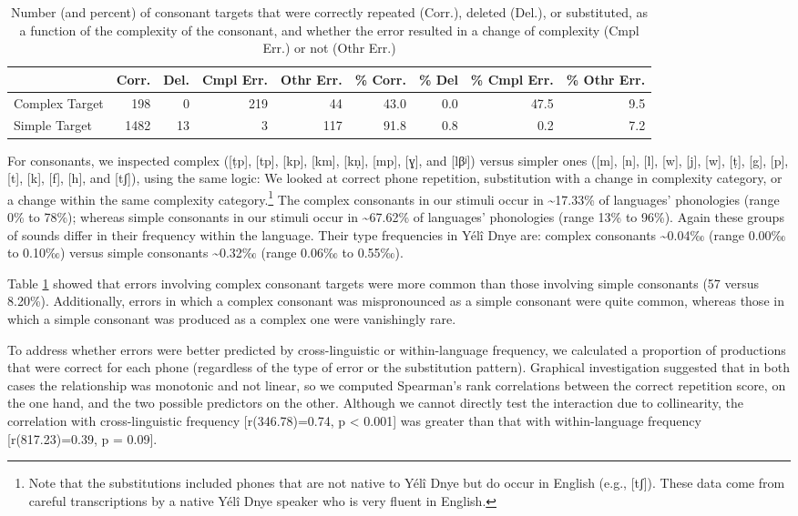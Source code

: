 \documentclass[
  english,
  ,man,floatsintext]{apa6}
\begin{document}
\begin{table}

\caption{\label{tab:tab-c}Number (and percent) of consonant targets that were correctly repeated (Corr.), deleted (Del.), or substituted, as a function of the complexity of the consonant, and whether the error resulted in a change of complexity (Cmpl Err.) or not (Othr Err.)}
\centering
\begin{tabular}[t]{lrrrrrrrr}
\toprule
  & Corr. & Del. & Cmpl Err. & Othr Err. & \% Corr. & \% Del & \% Cmpl Err. & \% Othr Err.\\
\midrule
Complex Target & 198 & 0 & 219 & 44 & 43.0 & 0.0 & 47.5 & 9.5\\
Simple Target & 1482 & 13 & 3 & 117 & 91.8 & 0.8 & 0.2 & 7.2\\
\bottomrule
\end{tabular}
\end{table}

For consonants, we inspected complex ({[}ṭp{]}, {[}tp{]}, {[}kp{]}, {[}km{]}, {[}kṇ{]}, {[}mp{]}, {[}ɣ{]}, and {[}lβʲ{]}) versus simpler ones ({[}m{]}, {[}n{]}, {[}l{]}, {[}w{]}, {[}j{]}, {[}w{]}, {[}ṭ{]}, {[}g{]}, {[}p{]}, {[}t{]}, {[}k{]}, {[}f{]}, {[}h{]}, and {[}tʃ{]}), using the same logic: We looked at correct phone repetition, substitution with a change in complexity category, or a change within the same complexity category.\footnote{Note that the substitutions included phones that are not native to Yélî Dnye but do occur in English (e.g., {[}tʃ{]}). These data come from careful transcriptions by a native Yélî Dnye speaker who is very fluent in English.}
The complex consonants in our stimuli occur in \textasciitilde17.33\% of languages' phonologies (range 0\% to 78\%);
whereas simple consonants in our stimuli occur in \textasciitilde67.62\% of languages' phonologies (range 13\% to 96\%).
Again these groups of sounds differ in their frequency within the language. Their type frequencies in Yélî Dnye are: complex consonants \textasciitilde0.04‰ (range 0.00‰ to 0.10‰) versus simple consonants \textasciitilde0.32‰ (range 0.06‰ to 0.55‰).

Table \ref{tab:tab-c} showed that errors involving complex consonant targets were more common than those involving simple consonants (57 versus 8.20\%). Additionally, errors in which a complex consonant was mispronounced as a simple consonant were quite common, whereas those in which a simple consonant was produced as a complex one were vanishingly rare.

To address whether errors were better predicted by cross-linguistic or within-language frequency, we calculated a proportion of productions that were correct for each phone (regardless of the type of error or the substitution pattern). Graphical investigation suggested that in both cases the relationship was monotonic and not linear, so we computed Spearman's rank correlations between the correct repetition score, on the one hand, and the two possible predictors on the other. Although we cannot directly test the interaction due to collinearity, the correlation with cross-linguistic frequency {[}r(346.78)=0.74, p \textless{} 0.001{]} was greater than that with within-language frequency {[}r(817.23)=0.39, p = 0.09{]}.
\end{document}
